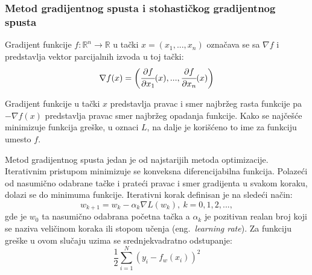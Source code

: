 \subsubsection{Metod gradijentnog spusta i stohastičkog gradijentnog spusta}

Gradijent funkcije $f:\mathbb{R}^n \rightarrow \mathbb{R}$ u tački $x=(x_1, ..., x_n)$ označava se sa $\nabla f$ i predstavlja vektor parcijalnih izvoda u toj tački:
\begin{equation}
\nabla f(x) = \bigg( \cfrac{\partial f}{\partial x_1}(x),...,\cfrac{\partial f}{\partial x_n}(x) \bigg)
\end{equation}

Gradijent funkcije u tački $x$ predstavlja pravac i smer najbržeg rasta funkcije pa $- \nabla f(x)$ predstavlja pravac smer najbržeg opadanja funkcije. Kako se najčešće minimizuje funkcija greške, u oznaci $L$, na dalje je korišćeno to ime za funkciju umesto $f$.
\par 
Metod gradijentnog spusta jedan je od najstarijih metoda  optimizacije. Iterativnim pristupom minimizuje se konveksna diferencijabilna funkcija. Polazeći od nasumično odabrane tačke i prateći pravac i smer gradijenta u svakom koraku, dolazi se do minimuma funkcije. Iterativni korak definisan je na sledeći način:
\begin{equation}
	\label{eq:gradijentni_spust}
	w_{k+1} = w_k - \alpha_k \nabla L(w_k),~ k=0, 1, 2, ... ,
\end{equation}
gde je $w_0$ ta nasumično odabrana početna tačka a $\alpha_k$ je pozitivan realan broj koji se naziva veličinom koraka ili stopom učenja (eng.~{\em learning rate}). 
Za funkciju greške u ovom slučaju uzima se srednjekvadratno odstupanje:
\begin{equation}
	\frac{1}{2}\sum_{i=1}^{N} (y_i - f_w(x_i))^2
\end{equation}

